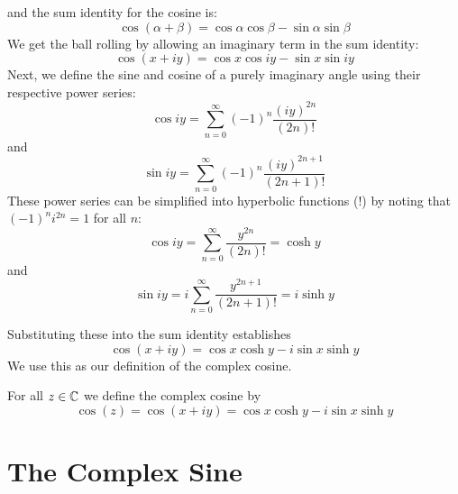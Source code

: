 \documentclass[handout]{ximera}
\begin{document}
and the sum identity for the cosine is:
\[
\cos(\alpha + \beta) = \cos\alpha \cos \beta - \sin \alpha \sin \beta
\]
We get the ball rolling by allowing an imaginary term in the sum identity:
\[
\cos(x+iy) = \cos x \cos iy - \sin x \sin iy
\]
Next, we define the sine and cosine of a purely imaginary angle using their respective power series:
\[
\cos iy = \sum_{n=0}^\infty (-1)^n \frac{(iy)^{2n}}{(2n)!} 
\]
and
\[
\sin iy = \sum_{n=0}^\infty (-1)^n \frac{(iy)^{2n+1}}{(2n+1)!} 
\]
These power series can be simplified into hyperbolic functions (!) by noting that $(-1)^n i^{2n} = 1$ for all $n$: 
\[
\cos iy= \sum_{n=0}^\infty  \frac{y^{2n}}{(2n)!} = \cosh y
\]
and
\[
\sin iy= i\sum_{n=0}^\infty \frac {y^{2n+1}}{(2n+1)!}= i\sinh y
\]

Substituting these into the sum identity establishes
\[
\cos(x+iy) = \cos x \cosh y - i\sin x \sinh y
\]
We use this as our definition of the complex cosine.
\begin{definition}
For all $z \in \mathbb C$ we define the complex cosine by
\[
\cos(z) = \cos(x+iy) = \cos x \cosh y - i\sin x \sinh y
\]
\end{definition}


\section{The Complex Sine}
\end{document}
